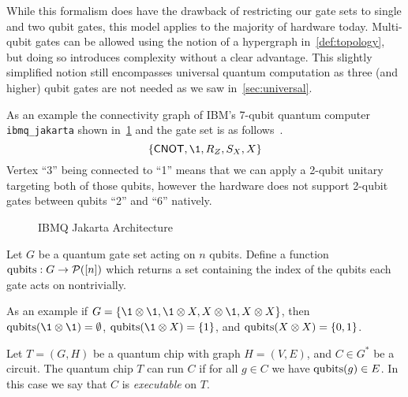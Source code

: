 While this formalism does have the drawback of restricting our gate sets to single and two qubit gates, this model applies to the majority of hardware today.
Multi-qubit gates can be allowed using the notion of a hypergraph in~\cref{def:topology}, but doing so introduces complexity without a clear advantage.
This slightly simplified notion still encompasses universal quantum computation as three (and higher) qubit gates are not needed as we saw in~\cref{sec:universal}.

As an example the connectivity graph of IBM's 7-qubit quantum computer \texttt{ibmq\_jakarta} shown in~\cref{fig:ibm-jakarta} and the gate set is as follows~\cite{ibmq}.
\begin{equation} %
    \qty{\CNOT, \1, R_Z, S_X, X}
\end{equation}
Vertex ``3'' being connected to ``1'' means that we can apply a 2-qubit unitary targeting both of those qubits, however the hardware does not support 2-qubit gates between qubits ``2'' and ``6'' natively.
\begin{figure}[ht]
    \centering
    
    \caption{IBMQ Jakarta Architecture}\label{fig:ibm-jakarta}
\end{figure}

\begin{definition}
    Let $G$ be a quantum gate set acting on $n$ qubits.
    Define a function $\operatorname{qubits}: G \to \mathcal{P}([n])$ which returns a set containing the index of the qubits each gate acts on nontrivially.
\end{definition}
As an example if $G = \qty{\1 \otimes \1, \1 \otimes X, X \otimes \1, X \otimes X}$, then $\qubits(\1 \otimes \1) = \emptyset$, $\qubits(\1 \otimes X) = \qty{1}$, and $\operatorname{qubits}(X \otimes X) = \qty{0, 1}$.

\begin{definition}
    Let $T = (G, H)$ be a quantum chip with graph $H = (V, E)$, and $C \in G^*$ be a circuit.
    The quantum chip $T$ can run $C$ if for all $g \in C$ we have $\operatorname{qubits}(g) \in E$.
    In this case we say that $C$ is \emph{executable} on $T$.
\end{definition}

